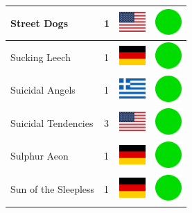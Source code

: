 \documentclass[12pt, a4paper, twoside]{report}
\begin{document}
\begin{center}
\begin{longtable}{|p{5cm}|p{2cm}|p{2cm}|p{2cm}|}
			Street Dogs & 1 & \includegraphics[width=1cm]{4x3/us} & \includegraphics[width=1cm]{likes/y} \\ \hline
			Sucking Leech & 1 & \includegraphics[width=1cm]{4x3/de} & \includegraphics[width=1cm]{likes/y} \\ \hline
			Suicidal Angels & 1 & \includegraphics[width=1cm]{4x3/gr} & \includegraphics[width=1cm]{likes/y} \\ \hline
			Suicidal Tendencies & 3 & \includegraphics[width=1cm]{4x3/us} & \includegraphics[width=1cm]{likes/y} \\ \hline
			Sulphur Aeon & 1 & \includegraphics[width=1cm]{4x3/de} & \includegraphics[width=1cm]{likes/y} \\ \hline
			Sun of the Sleepless & 1 & \includegraphics[width=1cm]{4x3/de} & \includegraphics[width=1cm]{likes/y} \\ \hline

\end{longtable}
\end{center}
\end{document}
